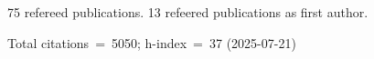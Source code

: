 75 refereed publications. 13 refeered publications as first author.

Total citations~=~5050; h-index~=~37 (2025-07-21)
